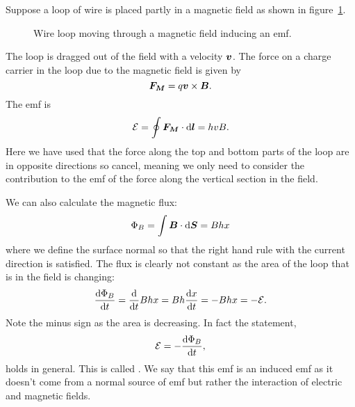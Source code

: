     Suppose a loop of wire is placed partly in a magnetic field as shown in figure~\ref{fig:induced emf in a loop moving through a magnetic field}.
    \begin{figure}[ht]
        \centering
        \caption{Wire loop moving through a magnetic field inducing an \gls{emf}.}
        \label{fig:induced emf in a loop moving through a magnetic field}
    \end{figure}
    The loop is dragged out of the field with a velocity \(\bm{v}\).
    The force on a charge carrier in the loop due to the magnetic field is given by
    \[\bm{F_M} = q\bm{v}\times\bm{B}.\]
    The \gls{emf} is
    \[\mathcal{E} = \oint\bm{F_M}\cdot\dd{\bm{l}} = hvB.\]
    Here we have used that the force along the top and bottom parts of the loop are in opposite directions so cancel, meaning we only need to consider the contribution to the \gls{emf} of the force along the vertical section in the field.
    
    We can also calculate the magnetic flux:
    \[\Phi_B = \int\bm{B}\cdot\dd{\bm{S}} = Bhx\]
    where we define the surface normal so that the right hand rule with the current direction is satisfied.
    The flux is clearly not constant as the area of the loop that is in the field is changing:
    \[\dv{\Phi_B}{t} = \dv{t}Bhx = Bh\dv{x}{t} = -Bhx = -\mathcal{E}.\]
    Note the minus sign as the area is decreasing.
    In fact the statement,
    \[\mathcal{E} = -\dv{\Phi_B}{t},\]
    holds in general.
    This is called .
    We say that this \gls{emf} is an induced \gls{emf} as it doesn't come from a normal source of \gls{emf} but rather the interaction of electric and magnetic fields.
    
